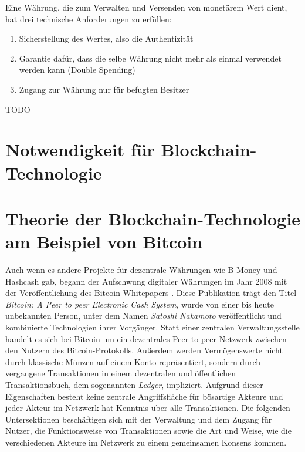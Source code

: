 Eine Währung, die zum Verwalten und Versenden von monetärem Wert dient, hat drei technische Anforderungen zu erfüllen:
\begin{enumerate}
	\item Sicherstellung des Wertes, also die Authentizität
	\item Garantie dafür, dass die selbe Währung nicht mehr als einmal verwendet werden kann (Double Spending)
	\item Zugang zur Währung nur für befugten Besitzer
\end{enumerate}
TODO
\section{Notwendigkeit für Blockchain-Technologie}
\section{Theorie der Blockchain-Technologie am Beispiel von Bitcoin}
Auch wenn es andere Projekte für dezentrale Währungen wie B-Money und Hashcash gab, begann der Aufschwung digitaler Währungen im Jahr 2008 mit der Veröffentlichung des Bitcoin-Whitepapers  \cite{nakamoto_2008}. Diese Publikation trägt den Titel \emph{Bitcoin: A Peer to peer Electronic Cash System}, wurde von einer bis heute unbekannten Person, unter dem Namen \emph{Satoshi Nakamoto} veröffentlicht und kombinierte Technologien ihrer Vorgänger. Statt einer zentralen Verwaltungsstelle handelt es sich bei Bitcoin um ein dezentrales Peer-to-peer Netzwerk zwischen den Nutzern des Bitcoin-Protokolls. Außerdem werden Vermögenswerte nicht durch klassische Münzen auf einem Konto repräsentiert, sondern durch vergangene Transaktionen in einem dezentralen und öffentlichen Transaktionsbuch, dem sogenannten \emph{Ledger}, impliziert. Aufgrund dieser Eigenschaften besteht keine zentrale Angriffsfläche für bösartige Akteure und jeder Akteur im Netzwerk hat Kenntnis über alle Transaktionen. Die folgenden Untersektionen beschäftigen sich mit der Verwaltung und dem Zugang für Nutzer, die Funktionsweise von Transaktionen sowie die Art und Weise, wie die verschiedenen Akteure im Netzwerk zu einem gemeinsamen Konsens kommen.
